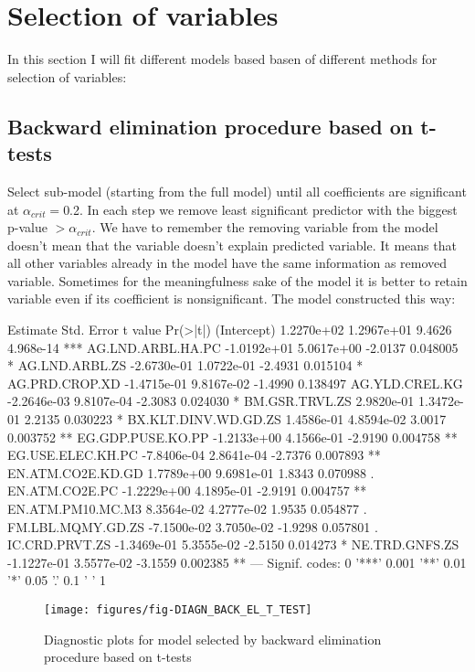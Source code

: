 \documentclass[a4paper]{article}
\begin{document}
\section{Selection of variables}
In this section I will fit different models based basen of different methods for
selection of variables:



\subsection{Backward elimination procedure based on t-tests}
Select sub-model (starting from the full model) until all coefficients are
significant at $\alpha_{crit}=$0.2. In each step we remove least
significant predictor with the biggest p-value $>\alpha_{crit}$. We have to
remember the removing variable from the model doesn't mean that the variable
doesn't explain predicted variable. It means that all other variables already in
the model have the same information as removed variable. Sometimes for the
meaningfulness sake of the model it is better to retain variable even if its
coefficient is nonsignificant. 
The model constructed this way:
\begin{Schunk}
\begin{Soutput}
                        Estimate  Std. Error t value  Pr(>|t|)    
(Intercept)           1.2270e+02  1.2967e+01  9.4626 4.968e-14 ***
AG.LND.ARBL.HA.PC    -1.0192e+01  5.0617e+00 -2.0137  0.048005 *  
AG.LND.ARBL.ZS       -2.6730e-01  1.0722e-01 -2.4931  0.015104 *  
AG.PRD.CROP.XD       -1.4715e-01  9.8167e-02 -1.4990  0.138497    
AG.YLD.CREL.KG       -2.2646e-03  9.8107e-04 -2.3083  0.024030 *  
BM.GSR.TRVL.ZS        2.9820e-01  1.3472e-01  2.2135  0.030223 *  
BX.KLT.DINV.WD.GD.ZS  1.4586e-01  4.8594e-02  3.0017  0.003752 ** 
EG.GDP.PUSE.KO.PP    -1.2133e+00  4.1566e-01 -2.9190  0.004758 ** 
EG.USE.ELEC.KH.PC    -7.8406e-04  2.8641e-04 -2.7376  0.007893 ** 
EN.ATM.CO2E.KD.GD     1.7789e+00  9.6981e-01  1.8343  0.070988 .  
EN.ATM.CO2E.PC       -1.2229e+00  4.1895e-01 -2.9191  0.004757 ** 
EN.ATM.PM10.MC.M3     8.3564e-02  4.2777e-02  1.9535  0.054877 .  
FM.LBL.MQMY.GD.ZS    -7.1500e-02  3.7050e-02 -1.9298  0.057801 .  
IC.CRD.PRVT.ZS       -1.3469e-01  5.3555e-02 -2.5150  0.014273 *  
NE.TRD.GNFS.ZS       -1.1227e-01  3.5577e-02 -3.1559  0.002385 ** 
---
Signif. codes:  0 '***' 0.001 '**' 0.01 '*' 0.05 '.' 0.1 ' ' 1
\end{Soutput}
\end{Schunk}

\begin{figure}[H]
\begin{center}
\texttt{[image: figures/fig-DIAGN\_BACK\_EL\_T\_TEST]}
\caption{Diagnostic plots for model selected by backward elimination procedure
based on t-tests}
\end{center}
\end{figure}
\end{document}

